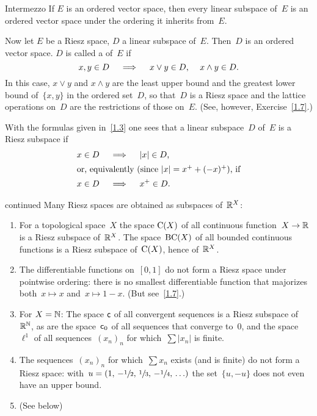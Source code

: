 \documentclass[main.tex]{subfiles}
\begin{document}
\begin{psec}{Intermezzo}
\label{1.6}
If $E$ is an ordered vector space, 
then every linear subspace of~$E$ is an ordered vector space
under the ordering it inherits from~$E$.

Now let $E$ be a Riesz space,
$D$ a linear subspace of~$E$.
Then~$D$ is an ordered vector space.
$D$ is called a  of~$E$
if
\begin{equation*}
x,y\in D \quad \implies \quad x\vee y\in D\text{, }\quad x\wedge y\in D
\text{.}
\end{equation*}
In this case,
$x\vee y$ and $x\wedge y$ are the least upper bound
and the greatest lower bound of~$\{x,y\}$ in the ordered set~$D$,
so that~$D$ is a Riesz space and the lattice operations on~$D$
are the restrictions of those on~$E$.
(See, however, Exercise~\ref{1.7}.)

With the formulas given in~\ref{1.3} one sees
that a linear subspace~$D$ of~$E$ is a Riesz subspace if
\begin{align*}
x\in D\quad &\implies \quad |x|\in D
\htam{,} \\ 
\intertext{%
or, 
equivalently
(since $|x|=x^+ + (-x)^+$), if}
x\in D \quad &\implies \quad x^+ \in D
\htam{.}
\end{align*}
\end{psec}
%
%
\begin{psec}[1.5]{continued}
\label{1.5_2}
Many Riesz spaces are obtained as subspaces of~$\mathbb{R}^X$:
\begin{enumerate}
\setcounter{enumi}{\value{list-1.5}}
\item
\label{1.5-3}
For a topological space~$X$ the space $\mathrm{C}(X)$
of all continuous function~$X\rightarrow\mathbb{R}$ is a Riesz subspace of~$\mathbb{R}^X$.
The space~$\mathrm{BC}(X)$ of all bounded continuous functions 
is a Riesz subspace of~$\mathrm{C}(X)$,
hence of~$\mathbb{R}^X$.
%
\item
\label{1.5-4}
The differentiable functions on~$[0,1]$ 
do not form a Riesz space
under pointwise ordering:
there is no smallest differentiable function
that majorizes both~$x\mapsto x$ and~$x\mapsto 1-x$.
(But see~\ref{1.7}.)
%
\item
\label{1.5-5}
For $X=\mathbb{N}$: 
The space $\mathsf{c}$ of all convergent sequences 
is a Riesz subspace of~$\mathbb{R}^{\mathbb{N}}$,
as are the space~$\mathsf{c}_0$
of all sequences that converge to~$0$,
and the space~$\ell^1$
of all sequences~$(x_n)_n$
for which~$\sum|x_n|$ is finite.
%
\item
\label{1.5-6}
The sequences~$(x_n)_n$ for which~$\sum x_n$ exists (and is finite)
do not form a Riesz space:
with~$u=(1,\,-\sfrac{1}{2},\, \sfrac{1}{3},\, -\sfrac{1}{4},\, \ldots)$
the set~$\{u,-u\}$
does not even have an upper bound.
%
\setcounter{list-1.5}{\value{enumi}}
\item
(See below)
\end{enumerate}
\end{psec}
\end{document}
